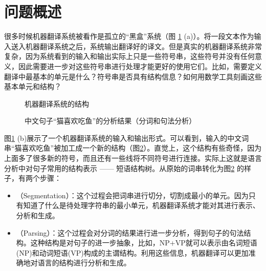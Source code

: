 
\section{问题概述 }

\parinterval 很多时候机器翻译系统被看作是孤立的``黑盒''系统（图 \ref {fig:2-1} (a)）。将一段文本作为输入送入机器翻译系统之后，系统输出翻译好的译文。但是真实的机器翻译系统非常复杂，因为系统看到的输入和输出实际上只是一些符号串，这些符号并没有任何意义，因此需要进一步对这些符号串进行处理才能更好的使用它们。比如，需要定义翻译中最基本的单元是什么？符号串是否具有结构信息？如何用数学工具刻画这些基本单元和结构？

\begin{figure}[htp]
    \centering
 	\subfigure[机器翻译系统被看作一个黑盒] {  }
 	\subfigure[机器翻系统 = 前/后处理 + 翻译引擎] {}
	\caption{机器翻译系统的结构}
    \label{fig:2-1}
\end{figure}

\begin{figure}[htp]
\centering

\caption{中文句子``猫喜欢吃鱼''的分析结果（分词和句法分析）}
\label{fig:2-2}
\end{figure}

\parinterval 图\ref{fig:2-1} (b)展示了一个机器翻译系统的输入和输出形式。可以看到，输入的中文词串``猫喜欢吃鱼''被加工成一个新的结构（图\ref {fig:2-2}）。直觉上，这个结构有些奇怪，因为上面多了很多新的符号，而且还有一些线将不同符号进行连接。实际上这就是语言分析中对句子常用的结构表示 —— 短语结构树。从原始的词串转化为图\ref {fig:2-2} 的样子，有两个步骤：

\begin{itemize}
\vspace{0.5em}
\item {\small{}}（Segmentation）：这个过程会把词串进行切分，切割成最小的单元。因为只有知道了什么是待处理字符串的最小单元，机器翻译系统才能对其进行表示、分析和生成。
\vspace{0.5em}
\item {\small{}}（Parsing）：这个过程会对分词的结果进行进一步分析，得到句子的句法结构。这种结构是对句子的进一步抽象，比如，NP+VP就可以表示由名词短语(NP)和动词短语(VP)构成的主谓结构。利用这些信息，机器翻译可以更加准确地对语言的结构进行分析和生成。
\vspace{0.5em}
\end{itemize}

